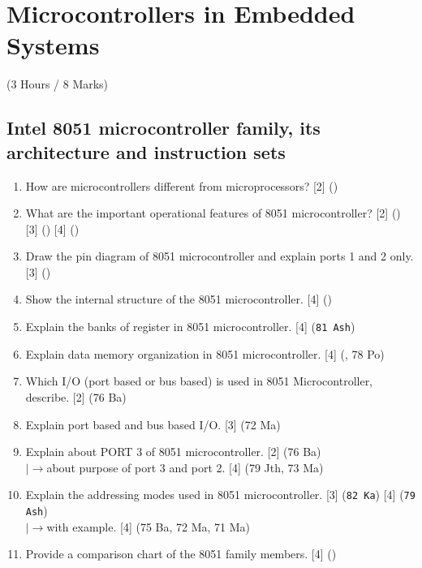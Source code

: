 \documentclass[12pt]{article}
\newcommand{\lb}{\\$\left|\rightarrow\right.$}
\begin{document}
\pagebreak

\section{Microcontrollers in Embedded Systems}
  \begin{center}(3 Hours / 8 Marks)\end{center}
  
  \subsection{Intel 8051 microcontroller family, its architecture and instruction sets}
    \begin{enumerate}
      \item How are microcontrollers different from microprocessors? \hfill [2] ()

      \item What are the important operational features of 8051 microcontroller? \hfill [2] () [3] () [4] ()

      \item Draw the pin diagram of 8051 microcontroller and explain ports 1 and 2 only. \hfill [3] ()

      \item Show the internal structure of the 8051 microcontroller. \hfill [4] ()
        
      \item Explain the banks of register in 8051 microcontroller. \hfill [4] (\texttt{81 Ash})

      \item Explain data memory organization in 8051 microcontroller. \hfill [4] (, 78 Po)
      
      \item Which I/O (port based or bus based) is used in 8051 Microcontroller, describe. \hfill [2] (76 Ba)

      \item Explain port based and bus based I/O. \hfill [3] (72 Ma)

      \item Explain about PORT 3 of 8051 microcontroller. \hfill [2] (76 Ba)
        \lb about purpose of port 3 and port 2. \hfill [4] (79 Jth, 73 Ma)

      \item Explain the addressing modes used in 8051 microcontroller. \hfill [3] (\texttt{82 Ka}) [4] (\texttt{79 Ash})
        \lb with example. \hfill [4] (75 Ba, 72 Ma, 71 Ma)

      \item Provide a comparison chart of the 8051 family members. \hfill [4] ()
    \end{enumerate}
\end{document}
